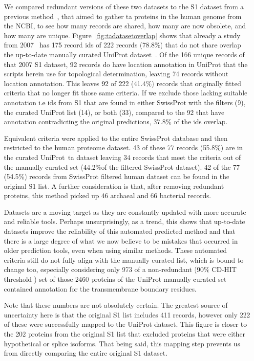 We compared redundant versions of these two datasets to the S1 dataset from a previous method~\cite{Kalbfleisch2007}, that aimed to gather \gls{ta} proteins in the human genome from the NCBI, to see how many records are shared, how many are now obsolete, and how many are unique.
Figure~\ref{fig:tadatasetoverlap} shows that already a study from 2007~\cite{Kalbfleisch2007} has 175 record ids of 222 records (78.8\%) that do not share overlap the up-to-date manually curated UniProt dataset~\cite{TheUniProtConsortium2014}.
Of the 166 unique records of that 2007 S1 dataset, 92 records do have location annotation in UniProt that the scripts herein use for topological determination, leaving 74 records without location annotation.
This leaves 92 of 222 (41.4\%) records that originally fitted criteria that no longer fit those same criteria.
If we exclude those lacking suitable annotation i.e ids from S1 that are found in either SwissProt with the filters (9), the curated UniProt list (14), or both (33), compared to the 92 that have annotation contradicting the original predictions, 37.8\% of the ids overlap.

Equivalent criteria were applied to the entire SwissProt database and then restricted to the human proteome dataset.
43 of these 77 records (55.8\%) are in the curated UniProt~\gls{ta}  dataset leaving 34 records that meet the criteria out of the manually curated set (44.2\%of the filtered SwissProt dataset).
42 of the 77 (54.5\%) records from SwissProt filtered human dataset can be found in the original S1 list.
A further consideration is that, after removing redundant proteins, this method picked up  46 archaeal and 66 bacterial records.

Datasets are a moving target as they are constantly updated with more accurate and reliable tools.
Perhaps unsurprisingly, as a trend, this shows that up-to-date datasets improve the reliability of this automated predicted method and that there is a large degree of what we now believe to be mistakes that occurred in older prediction tools, even when using similar methods.
These automated criteria still do not fully align with the manually curated list, which is bound to change too, especially considering only 973 of a non-redundant (90\% CD-HIT threshold \cite{Huang2010, Wu2011}) set of those 2460 proteins of the UniProt manually curated set contained annotation for the transmembrane boundary residues.

Note that these numbers are not absolutely certain.
The greatest source of uncertainty here is that the original S1 list includes 411 records, however only 222 of these were successfully mapped to the UniProt dataset.
This figure is closer to the 202 proteins from the original S1 list that excluded proteins that were either hypothetical or splice isoforms.
That being said, this mapping step prevents us from directly comparing the entire original S1 dataset.

